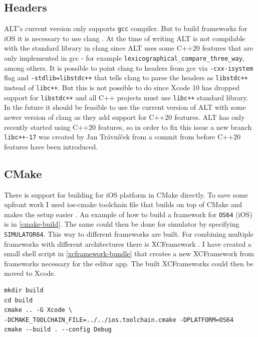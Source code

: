 \subsection{Headers}
ALT's current version only supports \lstinline{gcc} compiler. But to build frameworks for iOS it is necessary to use clang \cite{clang}. At the time of writing ALT is not compilable with the standard library in clang since ALT uses some C++20 features that are only implemented in gcc - for example \lstinline{lexicographical_compare_three_way}, among others. It is possible to point clang to headers from gcc via \lstinline{-cxx-isystem} flag and \lstinline{-stdlib=libstdc++} that tells clang to parse the headers as \lstinline{libstdc++} instead of \lstinline{libc++}. But this is not possible to do since Xcode 10 has dropped support for \lstinline{libstdc++} and all C++ projects must use \lstinline{libc++} standard library. In the future it should be feasible to use the current version of ALT with some newer version of clang as they add support for C++20 features. ALT has only recently started using C++20 features, so in order to fix this issue a new branch \lstinline{libc++-17} was created by Jan Trávníček from a commit from before C++20 features have been introduced.

\subsection{CMake}

There is support for building for iOS platform in CMake directly. To save some upfront work I used ios-cmake toolchain file that builds on top of CMake and makes the setup easier \cite{ios-cmake}. An example of how to build a framework for \lstinline{OS64} (iOS) is in \ref{cmake-build}. The same could then be done for simulator by specifying \lstinline{SIMULATOR64}. This way to different frameworks are built. For combining multiple frameworks with different architectures there is XCFramework \cite{xcframework}. I have created a small shell script in \ref{xcframework-bundle} that creates a new XCFramework from frameworks necessary for the editor app. The built XCFrameworks could then be moved to Xcode.

\begin{lstlisting}[caption=CMake build instructions, label=cmake-build]
mkdir build
cd build
cmake .. -G Xcode \
-DCMAKE_TOOLCHAIN_FILE=../../ios.toolchain.cmake -DPLATFORM=OS64
cmake --build . --config Debug
\end{lstlisting}

